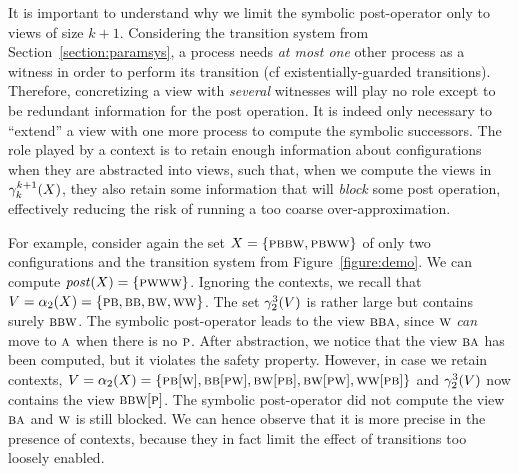 
It is important to understand why we limit the symbolic post-operator
only to views of size $k+1$.
%
Considering the transition system from Section~\ref{section:paramsys},
a process needs \emph{at most one} other process as a witness in order
to perform its transition (cf existentially-guarded transitions).
%
Therefore, concretizing a view with \emph{several} witnesses will play
no role except to be redundant information for the post operation. It
is indeed only necessary to ``extend'' a view with one more process to
compute the symbolic successors.
%
The role played by a context is to retain enough information about
configurations when they are abstracted into views, such that, when we
compute the views in $\gamma_{k}^{k+1}(X)$, they also retain
some information that will \emph{block} some post operation,
effectively reducing the risk of running a too coarse
over-approximation.

For example, consider again the set
$X=\{\textsc{p}\textsc{b}\textsc{b}\textsc{w},\textsc{p}\textsc{b}\textsc{w}\textsc{w}\}$ of only two configurations and the
transition system from Figure~\ref{figure:demo}.
%
We can compute $\mathit{post}(X) = \{\textsc{p}\textsc{w}\textsc{w}\textsc{w}\}$.
%
Ignoring the contexts, we recall that
$V=\alpha_{2}(X)=\{\textsc{p}\textsc{b},\textsc{b}\textsc{b},\textsc{b}\textsc{w},\textsc{w}\textsc{w}\}$.
%
The set $\gamma_{2}^{3}(V)$ is rather large but contains
surely $\textsc{b}\textsc{b}\textsc{w}$.
%
The symbolic post-operator leads to the view $\textsc{b}\textsc{b}\textsc{a}$, since $\textsc{w}$
\emph{can} move to $\textsc{a}$ when there is no $\textsc{p}$. After abstraction, we
notice that the view $\textsc{b}\textsc{a}$ has been computed, but it violates the
safety property.
%
However, in case we retain contexts,
$V=\alpha_{2}(X)=\{\textsc{p}\textsc{b}[\textsc{w}],\textsc{b}\textsc{b}[\textsc{p}\textsc{w}],\textsc{b}\textsc{w}[\textsc{p}\textsc{b}],\textsc{b}\textsc{w}[\textsc{p}\textsc{w}],\textsc{w}\textsc{w}[\textsc{p}\textsc{b}]\}$ %
and $\gamma_{2}^{3}(V)$ now contains the view $\textsc{b}\textsc{b}\textsc{w}[\textsc{p}]$.
%
The symbolic post-operator did not compute the view $\textsc{b}\textsc{a}$ and $\textsc{w}$
is still blocked.
%
We can hence observe that it is more precise in the presence of
contexts, because they in fact limit the effect of transitions too
loosely enabled.

